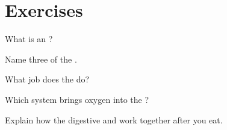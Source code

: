 \section{Exercises}

\begin{exercise}[$\star$]\label{exo:g4:body-systems:1}
What is an ?
\end{exercise}

\begin{exercise}[$\star$]\label{exo:g4:body-systems:2}
Name three  of the .
\end{exercise}

\begin{exercise}[$\star$]\label{exo:g4:body-systems:3}
What job does the  do?
\end{exercise}

\begin{exercise}[$\star$]\label{exo:g4:body-systems:4}
Which system brings oxygen into the ?
\end{exercise}

\begin{exercise}[$\star\star$]\label{exo:g4:body-systems:5}
Explain how the digestive and  work together after
you eat.
\end{exercise}


